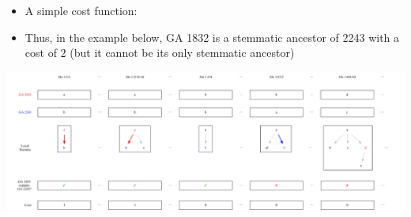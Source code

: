\documentclass[10pt]{beamer}
\begin{document}
	\begin{frame}
		\begin{itemize}
			\item A simple cost function: 
			\item Thus, in the example below, GA 1832 is a stemmatic ancestor of 2243 with a cost of $2$ (but it cannot be its only stemmatic ancestor)
		\end{itemize}
		\begin{center}
			\includegraphics[width=\textwidth]{../img/explained-readings-costs.pdf}
		\end{center}
	\end{frame}
\end{document}
